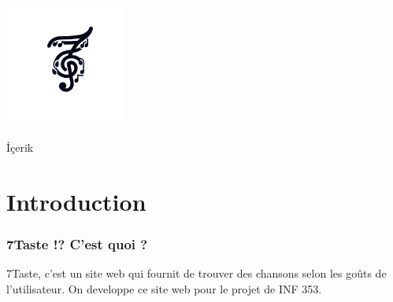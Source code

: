 \documentclass[20pt]{beamer}
\date{}
\author{İsmet Karadağ \\ Furkan Özel}
\institute{Université Galatasaray, INF 353}
\begin{document}
\begin{frame}[plain]
    \begin{center}
        \includegraphics[width=0.3\textwidth]{7tst.png}    
    \end{center}
    \maketitle
\end{frame}

\begin{frame}{İçerik}
    \begin{multicols}{2}
        \tableofcontents
    \end{multicols}
\end{frame}

\section{Introduction}

\begin{frame}
    \frametitle{7Taste !? C'est quoi ?}
        7Taste, c'est un site web qui fournit de trouver des chansons selon les goûts de l'utilisateur. On developpe ce site web pour le projet de INF 353.
\end{frame}
\end{document}
